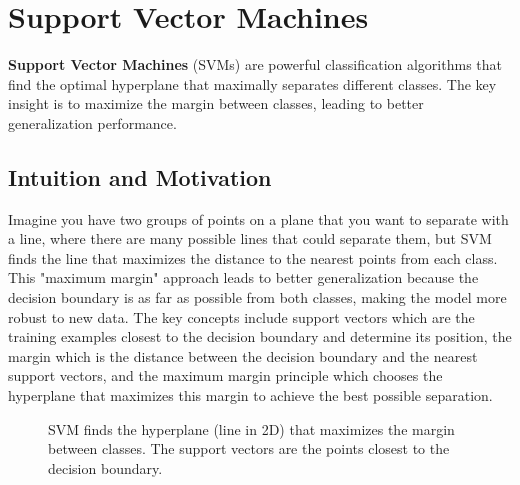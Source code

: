 
\section{Support Vector Machines }
\label{sec:svm}

\textbf{Support Vector Machines} (SVMs) are powerful classification algorithms that find the optimal hyperplane that maximally separates different classes. The key insight is to maximize the margin between classes, leading to better generalization performance.

\subsection{Intuition and Motivation}

Imagine you have two groups of points on a plane that you want to separate with a line, where there are many possible lines that could separate them, but SVM finds the line that maximizes the distance to the nearest points from each class. This "maximum margin" approach leads to better generalization because the decision boundary is as far as possible from both classes, making the model more robust to new data. The key concepts include support vectors which are the training examples closest to the decision boundary and determine its position, the margin which is the distance between the decision boundary and the nearest support vectors, and the maximum margin principle which chooses the hyperplane that maximizes this margin to achieve the best possible separation.

\begin{figure}[htbp]
\centering
{}
\caption{SVM finds the hyperplane (line in 2D) that maximizes the margin between classes. The support vectors are the points closest to the decision boundary.}
\label{fig:svm-margin}
\end{figure}

